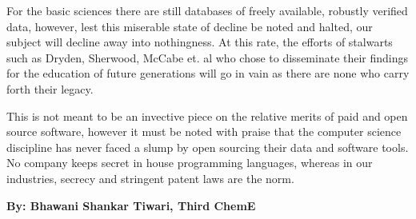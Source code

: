 \documentclass[11pt]{article} %
\begin{document}
\begin{minipage}[t]{.66\linewidth}
  For the basic sciences there are still databases of freely available, robustly
  verified data, however, lest this miserable state of decline be noted and
  halted, our subject will decline away into nothingness. At this rate, the
  efforts of stalwarts such as Dryden, Sherwood, McCabe et. al who chose to
  disseminate their findings for the education of future generations will go in
  vain as there are none who carry forth their legacy.

  This is not meant to be an invective piece on the relative merits of paid and
  open source software, however it must be noted with praise that the computer
  science discipline has never faced a slump by open sourcing their data and
  software tools. No company keeps secret in house programming languages,
  whereas in our industries, secrecy and stringent patent laws are the norm.
\end{minipage}
%
%

\deco{10pt}{$\clubsuit$~$\clubsuit$~$\clubsuit$}
  \hypertarget{fireBalls}{}  %
  { \small  \textbf{By: Bhawani Shankar Tiwari, Third ChemE}\\ }
\end{document}
